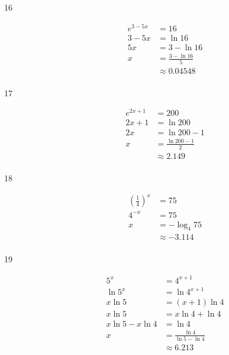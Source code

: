 \documentclass{exam}
\begin{document}
\begin{description}
      \item[16]
        \begin{align*}
          e^{3 - 5x} &= 16 \\
          3 - 5x     &= \ln 16 \\
          5x         &= 3 - \ln 16 \\
          x          &= \frac{3 - \ln 16}{5} \\
                     &\approx \boxed{0.04548} \\
        \end{align*}

      \item[17]
        \begin{align*}
          e^{2x + 1} &= 200 \\
          2x + 1     &= \ln 200 \\
          2x         &= \ln 200 - 1 \\
          x          &= \frac{\ln 200 - 1}{2} \\
                     &\approx \boxed{2.149} \\
        \end{align*}

      \item[18]
        \begin{align*}
          \left( \frac{1}{4} \right)^x &= 75 \\
          4^{-x}                       &= 75 \\
          x                            &= -\log_4 75 \\
                                       &\approx \boxed{-3.114} \\
        \end{align*}

      \item[19]
        \begin{align*}
          5^x               &= 4^{x + 1} \\
          \ln 5^x           &= \ln 4^{x + 1} \\
          x \ln 5           &= (x  + 1) \ln 4 \\
          x \ln 5           &= x \ln 4 + \ln 4 \\
          x \ln 5 - x \ln 4 &= \ln 4 \\
          x                 &= \frac{\ln 4}{\ln 5 - \ln 4} \\
                            &\approx \boxed{6.213} \\
        \end{align*}


\end{description}
\end{document}
